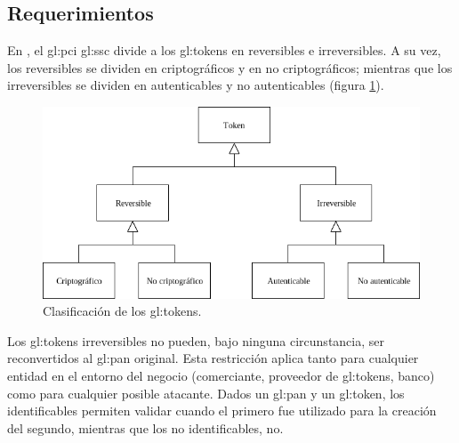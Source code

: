 %
%

\subsection{Requerimientos}
\label{sec:requerimientos}

En \cite{pci_tokens}, el \gls{gl:pci} \gls{gl:ssc} divide a los
\glspl{gl:token} en reversibles e irreversibles. A su vez, los reversibles se
dividen en criptográficos y en no criptográficos; mientras que los
irreversibles se dividen en autenticables y no autenticables (figura
\ref{fig:division_tokens}).

\begin{figure}
  \begin{center}
    \includegraphics[width=0.75\linewidth]{diagramas/clasificacion.png}
    \caption{Clasificación de los \glspl{gl:token}.}
    \label{fig:division_tokens}
  \end{center}
\end{figure}

Los \glspl{gl:token} irreversibles no pueden, bajo ninguna circunstancia, ser
reconvertidos al \gls{gl:pan} original. Esta restricción aplica tanto para
cualquier entidad en el entorno del negocio (comerciante, proveedor de
\glspl{gl:token}, banco) como para cualquier posible atacante. Dados un
\gls{gl:pan} y un \gls{gl:token}, los identificables permiten validar cuando el
primero fue utilizado para la creación del segundo, mientras que los no
identificables, no.



